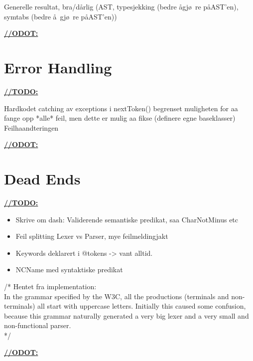 Generelle resultat, bra/d\aa rlig (AST, typesjekking (bedre \aa gj\o~re p\aa AST'en),
symtabs (bedre \aa~gj\o~re p\aa AST'en))

\underline{\textbf{\LARGE //ODOT:}}

\section{Error Handling}
\underline{\textbf{\LARGE //TODO:}}

Hardkodet catching av exceptions i nextToken() begrenset muligheten for aa
fange opp *alle* feil, men dette er mulig aa fikse (definere egne baseklasser)
Feilhaandteringen

\underline{\textbf{\LARGE //ODOT:}}

\section{Dead Ends}
\underline{\textbf{\LARGE //TODO:}}

\begin{itemize}
\item Skrive om dash: Validerende semantiske predikat, saa CharNotMinus etc
\item Feil splitting Lexer vs Parser, mye feilmeldingjakt
\item Keywords deklarert i @tokens -> vant alltid.
\item NCName med syntaktiske predikat
\end{itemize}

/* Hentet fra implementation: \\
In the grammar specified by the W3C, all the productions (terminals and
non-terminals) all start with uppercase letters. Initially this caused some
confusion, because this grammar naturally generated a very big lexer and a very
small and non-functional parser. \\
*/

\underline{\textbf{\LARGE //ODOT:}}


